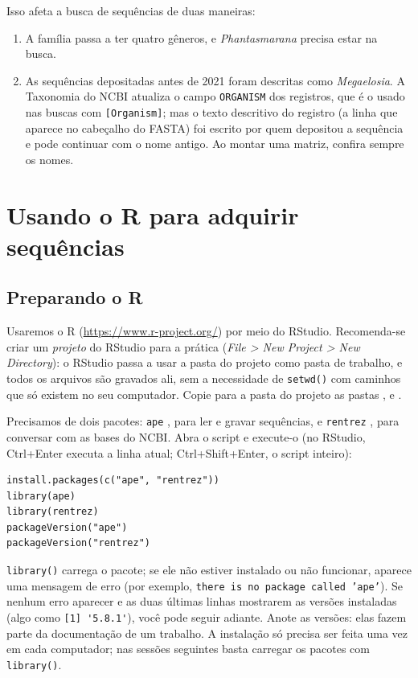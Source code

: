 \documentclass[11pt,a4paper]{article}
\newcommand{\arq}[1]{\path{#1}}
\newcommand{\ui}[1]{\textit{#1}}
\newcommand{\tecla}[1]{\textsf{#1}}
\begin{document}
Isso afeta a busca de sequências de duas maneiras:
\begin{enumerate}
\item A família passa a ter quatro gêneros, e \emph{Phantasmarana} precisa estar na busca.
\item As sequências depositadas antes de 2021 foram descritas como \emph{Megaelosia}. A
Taxonomia do NCBI atualiza o campo \texttt{ORGANISM} dos registros, que é o usado nas buscas
com \verb|[Organism]|; mas o texto descritivo do registro (a linha que aparece no cabeçalho do
FASTA) foi escrito por quem depositou a sequência e pode continuar com o nome antigo. Ao montar
uma matriz, confira sempre os nomes.
\end{enumerate}

\section{Usando o R para adquirir sequências}

\subsection{Preparando o R}

Usaremos o R (\url{https://www.r-project.org/}) por meio do RStudio. Recomenda-se criar um
\emph{projeto} do RStudio para a prática (\ui{File > New Project > New Directory}): o RStudio
passa a usar a pasta do projeto como pasta de trabalho, e todos os arquivos são gravados ali,
sem a necessidade de \verb|setwd()| com caminhos que só existem no seu computador. Copie para a
pasta do projeto as pastas \arq{R}, \arq{dados} e \arq{referencia}.

Precisamos de dois pacotes: \texttt{ape} \cite{paradis2019}, para ler e gravar sequências, e
\texttt{rentrez} \cite{winter2017}, para conversar com as bases do NCBI. Abra o script
\arq{R/01_preparar_R.R} e execute-o (no RStudio, \tecla{Ctrl+Enter} executa a linha atual;
\tecla{Ctrl+Shift+Enter}, o script inteiro):
\begin{Verbatim}
install.packages(c("ape", "rentrez"))
library(ape)
library(rentrez)
packageVersion("ape")
packageVersion("rentrez")
\end{Verbatim}
\verb|library()| carrega o pacote; se ele não estiver instalado ou não funcionar, aparece uma
mensagem de erro (por exemplo, \texttt{there is no package called 'ape'}). Se nenhum erro
aparecer e as duas últimas linhas mostrarem as versões instaladas (algo como
\verb|[1] '5.8.1'|), você pode seguir adiante. Anote as versões: elas fazem parte da
documentação de um trabalho. A instalação só precisa ser feita uma vez em cada computador; nas
sessões seguintes basta carregar os pacotes com \verb|library()|.
\end{document}
